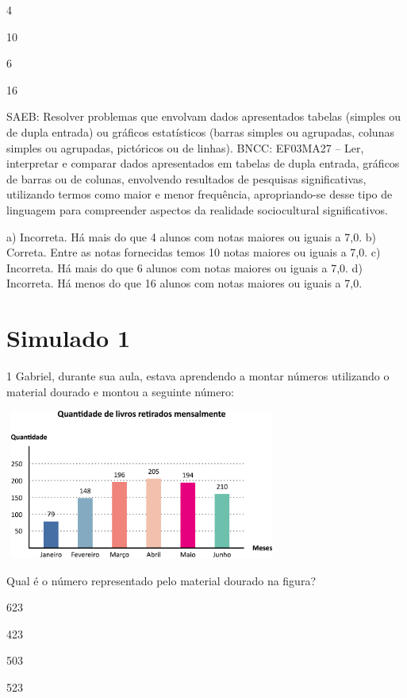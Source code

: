 \begin{multicols}{2}
\begin{enumerate}
{\begin{escolha}
\item
  4
\item
  10
\item
  6
\item
  16
\end{escolha}

SAEB: Resolver problemas que envolvam dados apresentados tabelas (simples ou de dupla entrada) ou gráficos estatísticos (barras simples ou agrupadas, colunas simples ou agrupadas, pictóricos ou de linhas). 
BNCC: EF03MA27 -- Ler, interpretar e comparar dados apresentados em tabelas de dupla entrada,
gráficos de barras ou de colunas, envolvendo resultados de pesquisas significativas, utilizando
termos como maior e menor frequência, apropriando-se desse tipo de linguagem para
compreender aspectos da realidade sociocultural significativos.

a) Incorreta. Há mais do que 4 alunos com notas maiores ou iguais a 7,0.
b) Correta. Entre as notas fornecidas temos 10 notas maiores ou iguais a 7,0.
c) Incorreta. Há mais do que 6 alunos com notas maiores ou iguais a 7,0.
d) Incorreta. Há menos do que 16 alunos com notas maiores ou iguais a 7,0.


\chapter{Simulado 1}

\num{1} Gabriel, durante sua aula, estava aprendendo a montar números utilizando o
material dourado e montou a seguinte número:


\includegraphics[width=3.55128in,height=1.93600in]{media/image106.png}

Qual é o número representado pelo material dourado na figura?

\begin{escolha}
\item
  623
\item
  423
\item
  503
\item
  523
\end{escolha}

}
\end{enumerate}
\end{multicols}

